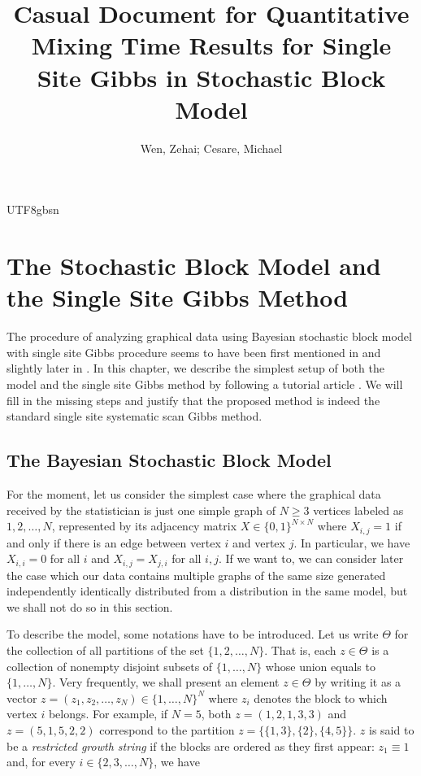 \documentclass[12pt]{report}
\title{Casual Document for 
Quantitative Mixing Time Results for Single Site Gibbs in Stochastic Block Model}
\author{Wen, Zehai; Cesare, Michael}
\date{\DTMnow}
\theoremstyle{plain}
\theoremstyle{definition}
\begin{document}
\begin{CJK*}{UTF8}{gbsn}
\maketitle

\setcounter{tocdepth}{0}
\tableofcontents

\chapter{The Stochastic Block Model and the Single Site Gibbs Method}

The procedure of analyzing graphical data 
using Bayesian stochastic block model with single 
site Gibbs procedure seems to have been first 
mentioned in \cite{Kemp_et_al_2004}
and slightly later in \cite{Xu_et_al_2006}.
In this chapter, we
describe the simplest setup of both the model and the single site Gibbs method
by following a tutorial article \cite{Schmidt_Morup_2013}.
We will fill in the missing steps and justify that the proposed method 
is indeed the standard single site systematic scan Gibbs method.

\section{The Bayesian Stochastic Block Model}\label{sec:basic_setup}

For the moment, 
let us consider the simplest case where
the graphical data received by the statistician is just
one simple graph of $N \geqslant 3$ vertices
labeled as $1, 2, \ldots, N$,
represented by its adjacency matrix $X \in \{0,1\}^{N \times N}$
where $X_{i,j} = 1$ if and only if there is an edge between vertex $i$ and vertex $j$.
In particular, we have $X_{i,i} = 0$ for all $i$ and
$X_{i,j} = X_{j,i}$ for all $i,j$.
If we want to, 
we can consider later the case which our data contains 
multiple graphs of the same size generated independently identically distributed 
from a distribution in the same model, but we shall not do so in this section.

To describe the model, 
some notations have to be introduced.
Let us write $\Theta$
for the collection of all partitions of the set $\{1, 2, \ldots, N\}$.
That is, each $z \in \Theta$ is a collection 
of nonempty disjoint subsets of $\{1,\ldots, N\}$
whose union equals to $\{1,\ldots, N\}$.
Very frequently, we shall present 
an element $z \in \Theta$ 
by writing it 
as a vector $z = (z_1, z_2, \ldots, z_N) \in \{1, \ldots, N\}^N$
where $z_i$ denotes the block to which vertex $i$ belongs.
For example, if $N = 5$, both 
$z = (1, 2, 1, 3, 3)$ and $z = (5,1,5,2,2)$
correspond to the partition $z = \{\{1, 3\}, \{2\}, \{4, 5\}\}$.
$z$ is said to be a \textit{restricted growth string}
if the blocks are ordered as they first appear: $z_1 \equiv 1$
and, for every $i \in \{2, 3, \ldots, N\}$, we have


\end{CJK*}
\end{document}
